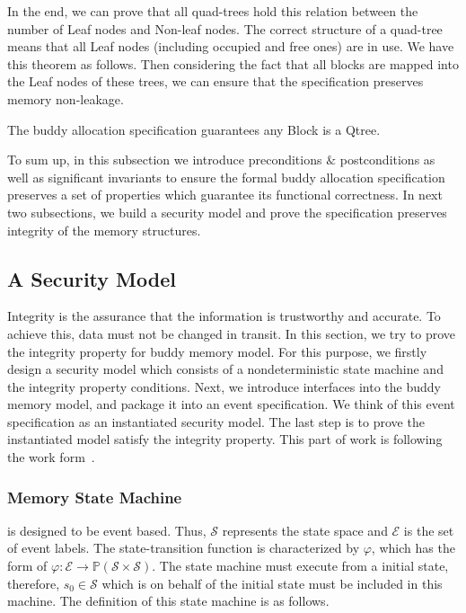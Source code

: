 In the end, we can prove that all quad-trees hold this relation between the number of Leaf nodes and Non-leaf nodes. The correct structure of a quad-tree means that all Leaf nodes (including occupied and free ones) are in use. We have this theorem as follows. Then considering the fact that all blocks are mapped into the Leaf nodes of these trees, we can ensure that the specification preserves memory non-leakage.

\begin{theorem}
The buddy allocation specification guarantees any Block is a Qtree.
\end{theorem}

To sum up, in this subsection we introduce preconditions $\&$ postconditions as well as significant invariants to ensure the formal buddy allocation specification preserves a set of properties which guarantee its functional correctness. In next two subsections, we build a security model and prove the specification preserves integrity of the memory structures.

\subsection{A Security Model}\label{sec:securitymodel}
Integrity is the assurance that the information is trustworthy and accurate. To achieve this, data must not be changed in transit. In this section, we try to prove the integrity property for buddy memory model. For this purpose, we firstly design a security model which consists of a nondeterministic state machine and the integrity property conditions. Next, we introduce interfaces into the buddy memory model, and package it into an event specification. We think of this event specification as an instantiated security model. The last step is to prove the instantiated model satisfy the integrity property. This part of work is following the work form~\cite{reg_securitymodel}.

\subsubsection{Memory State Machine} is designed to be event based. Thus, $\mathcal{S}$ represents the state space and $\mathcal{E}$ is the set of event labels. The state-transition function is characterized by $\varphi$, which has the form of $\varphi: \mathcal{E} \rightarrow \mathbb{P}(\mathcal{S} \times \mathcal{S})$. The state machine must execute from a initial state, therefore, $s_0 \in \mathcal{S}$ which is on behalf of the initial state must be included in this machine. The definition of this state machine is as follows.

